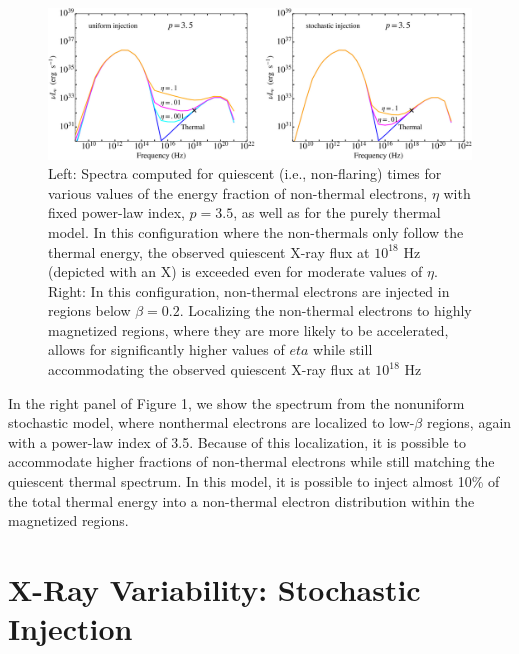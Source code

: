 \begin{figure}
\centering
\includegraphics[angle=0,width=\columnwidth]{paper1_fig1}
\caption{Left: Spectra computed for quiescent (i.e., non-flaring) times for various values of the energy fraction of non-thermal electrons, $\eta$ with fixed power-law index, $p=3.5$, as well as for the purely thermal model.  In this configuration where the non-thermals only follow the thermal energy, the observed quiescent X-ray flux at $10^{18}$ Hz (depicted with an X) is exceeded even for moderate values of $\eta$.  Right: In this configuration, non-thermal electrons are injected in regions below $\beta=0.2$.  Localizing the non-thermal electrons to highly magnetized regions, where they are more likely to be accelerated, allows for significantly higher values of $eta$ while still accommodating the observed quiescent X-ray flux at $10^{18}$ Hz}
\label{fig1}
\end{figure}

In the right panel of Figure 1, we show the spectrum from the nonuniform stochastic model, where nonthermal electrons are localized to low-$\beta$ regions, again
with a power-law index of 3.5. Because of this localization, it is possible to accommodate higher fractions
of non-thermal electrons while still matching the quiescent thermal spectrum. In this model, it is possible
to inject almost 10\% of the total thermal energy into a
non-thermal electron distribution within the magnetized regions.
\section{X-Ray Variability: Stochastic Injection}



